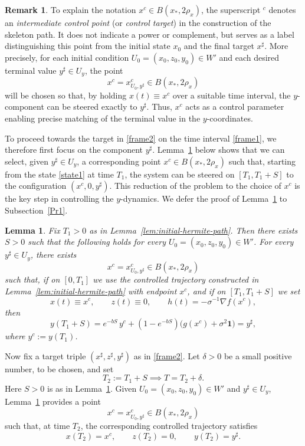 \documentclass[11pt, a4paper,leqno]{amsart}
\newtheorem{lemma}{Lemma}[section]
\theoremstyle{definition}
\newtheorem{remark}{Remark}[section]
\numberwithin{equation}{section}
\begin{document}
\begin{remark}
To explain the notation \(x^c\in B(x_\ast,2\rho_x)\), the superscript
\(^c\) denotes an \emph{intermediate control point} (or \emph{control target})
in the construction of the skeleton path. It does not indicate a power or
complement, but serves as a label distinguishing this point from the initial
state \(x_0\) and the final target \(x^\sharp\). More precisely, for each
initial condition \(U_0=(x_0,z_0,y_0)\in W'\) and each desired terminal value
\(y^\sharp\in U_y\), the point
\[
x^c=x^c_{U_0,y^\sharp}\in B(x_\ast,2\rho_x)
\]
will be chosen so that, by holding \(x(t)\equiv x^c\) over a suitable time interval,
the \(y\)-component can be steered exactly to \(y^\sharp\). Thus, \(x^c\) acts
as a control parameter enabling precise matching of the terminal value in the
\(y\)-coordinates.
\end{remark}

To proceed towards the target in \eqref{frame2} on the time interval
\eqref{frame1}, we therefore first focus on the component \(y^\sharp\).
Lemma~\ref{keylem} below shows that we can select, given \(y^\sharp\in U_y\),
a corresponding point \(x^c\in B(x_\ast,2\rho_x)\) such that, starting from
the state \eqref{state1} at time \(T_1\), the system can be steered on
\([T_1,T_1+S]\) to the configuration \((x^c,0,y^\sharp)\). This reduction
of the problem to the choice of \(x^c\) is the key step in controlling the
\(y\)-dynamics. We defer the proof of Lemma~\ref{keylem} to Subsection~\ref{Pr1}.






\begin{lemma}\label{keylem}
Fix \(T_1>0\) as in Lemma~\ref{lem:initial-hermite-path}. Then there exists
\(S>0\) such that the following holds for every \(U_0=(x_0,z_0,y_0)\in W'\). For every \(y^\sharp\in U_y\), there exists
\[
x^c=x^c_{U_0,y^\sharp}\in B(x_\ast,2\rho_x)
\]
such that, if on \([0,T_1]\) we use the controlled trajectory constructed in
Lemma~\ref{lem:initial-hermite-path} with endpoint \(x^c\), and if on
\([T_1,T_1+S]\) we set
\[
x(t)\equiv x^c,\qquad z(t)\equiv 0,\qquad
h(t)=-\sigma^{-1}\nabla f(x^c),
\]
then
\[
y(T_1+S)
=
e^{-bS}\,y^c
+
(1-e^{-bS})\bigl(g(x^c)+\sigma^2\mathbf 1\bigr)
=
y^\sharp,
\]
where \(y^c:=y(T_1)\).
\end{lemma}





Now fix a target triple $(x^\sharp,z^\sharp,y^\sharp)$ as in \eqref{frame2}. Let \(\delta>0\) be a small positive
number, to be chosen, and set
\[
T_2:=T_1+S\implies
T=T_2+\delta.
\]
Here \(S>0\) is as in Lemma~\ref{keylem}. Given \(U_0=(x_0,z_0,y_0)\in W'\) and \(y^\sharp\in U_y\), Lemma~\ref{keylem}
provides a point
\[
x^c=x^c_{U_0,y^\sharp}\in B(x_\ast,2\rho_x)
\]
such that, at time \(T_2\), the corresponding controlled trajectory satisfies
\begin{equation}\label{state2}
x(T_2)=x^c,\qquad z(T_2)=0,\qquad y(T_2)=y^\sharp.
\end{equation}
\end{document}
